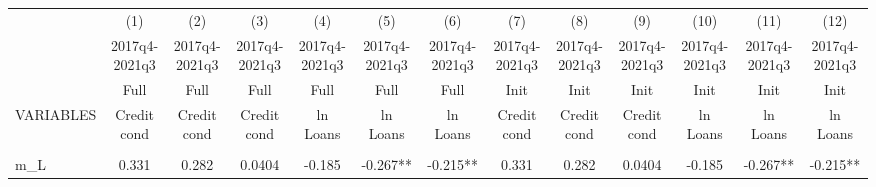\documentclass[]{article}
\begin{document}
\begin{center}
\begin{tabular}{lcccccccccccc} \hline
 & (1) & (2) & (3) & (4) & (5) & (6) & (7) & (8) & (9) & (10) & (11) & (12) \\
 & 2017q4-2021q3 & 2017q4-2021q3 & 2017q4-2021q3 & 2017q4-2021q3 & 2017q4-2021q3 & 2017q4-2021q3 & 2017q4-2021q3 & 2017q4-2021q3 & 2017q4-2021q3 & 2017q4-2021q3 & 2017q4-2021q3 & 2017q4-2021q3 \\
 & Full & Full & Full & Full & Full & Full & Init & Init & Init & Init & Init & Init \\
VARIABLES & Credit cond & Credit cond & Credit cond & ln Loans & ln Loans & ln Loans & Credit cond & Credit cond & Credit cond & ln Loans & ln Loans & ln Loans \\ \hline
\vspace{4pt} & \begin{footnotesize}\end{footnotesize} & \begin{footnotesize}\end{footnotesize} & \begin{footnotesize}\end{footnotesize} & \begin{footnotesize}\end{footnotesize} & \begin{footnotesize}\end{footnotesize} & \begin{footnotesize}\end{footnotesize} & \begin{footnotesize}\end{footnotesize} & \begin{footnotesize}\end{footnotesize} & \begin{footnotesize}\end{footnotesize} & \begin{footnotesize}\end{footnotesize} & \begin{footnotesize}\end{footnotesize} & \begin{footnotesize}\end{footnotesize} \\
m\_L & 0.331 & 0.282 & 0.0404 & -0.185 & -0.267** & -0.215** & 0.331 & 0.282 & 0.0404 & -0.185 & -0.267** & -0.215** \\

\end{tabular}
\end{center}
\end{document}
